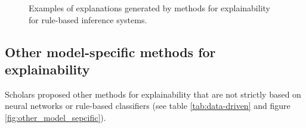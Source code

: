 \documentclass[final,1p,times]{elsarticle}
\begin{document}
\begin{figure}[!ht]
\begin{minipage}{\textwidth}
\centering
  \begin{subfigure}[b]{.32\linewidth}
  \centering
  \newline
  \end{subfigure}
    \begin{subfigure}[b]{.32\linewidth}
  \centering
  \end{subfigure}
  \begin{subfigure}[b]{.31\linewidth}
  \centering
  \newline
  \end{subfigure}
  \caption{Examples of explanations generated by methods for explainability for rule-based inference systems.}
  \label{fig:rule_based_approaches}
\end{minipage}
\end{figure}


\subsection{Other model-specific methods for explainability}
Scholars proposed other methods for explainability that are not strictly based on neural networks or rule-based classifiers (see table \ref{tab:data-driven} and figure \ref{fig:other_model_sepcific}). 
\end{document}

